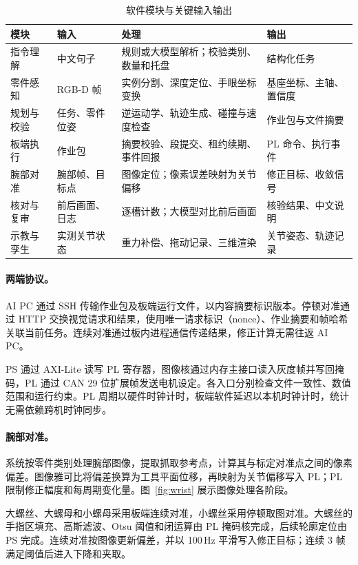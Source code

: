 \begin{table}[H]
\centering\small
\renewcommand{\arraystretch}{1.08}
\caption{软件模块与关键输入输出}\label{tab:sw}
\begin{tabularx}{\linewidth}{@{}p{2.3cm} Y Y Y@{}}
\toprule
模块 & 输入 & 处理 & 输出 \\
\midrule
指令理解 & 中文句子 & 规则或大模型解析；校验类别、数量和托盘 & 结构化任务  \\
零件感知 & RGB-D 帧 & 实例分割、深度定位、手眼坐标变换 & 基座坐标、主轴、置信度 \\
规划与校验 & 任务、零件位姿 & 逆运动学、轨迹生成、碰撞与速度检查 & 作业包与文件摘要 \\
板端执行 & 作业包 & 摘要校验、段提交、租约续期、事件回报 & PL 命令、执行事件 \\
腕部对准 & 腕部帧、目标点 & 图像定位；像素误差映射为关节偏移 & 修正目标、收敛信号 \\
核对与复审 & 前后画面、日志 & 逐槽计数；大模型对比前后画面 & 核验结果、中文说明 \\
示教与孪生 & 实测关节状态 & 重力补偿、拖动记录、三维渲染 & 关节姿态、轨迹记录 \\
\bottomrule
\end{tabularx}
\end{table}

\paragraph{两端协议。}AI PC 通过 SSH 传输作业包及板端运行文件，以内容摘要标识版本。停顿对准通过 HTTP 交换视觉请求和结果，使用唯一请求标识（nonce）、作业摘要和帧哈希关联当前任务。连续对准通过板内进程通信传递结果，修正计算无需往返 AI PC。

PS 通过 AXI-Lite 读写 PL 寄存器，图像核通过内存主接口读入灰度帧并写回掩码，PL 通过 CAN 29 位扩展帧发送电机设定。各入口分别检查文件一致性、数值范围和运行约束。PL 周期以硬件时钟计时，板端软件延迟以本机时钟计时，统计无需依赖跨机时钟同步。

\paragraph{腕部对准。}系统按零件类别处理腕部图像，提取抓取参考点，计算其与标定对准点之间的像素偏差。图像雅可比将偏差换算为工具平面位移，再映射为关节偏移写入 PL；PL 限制修正幅度和每周期变化量。图~\ref{fig:wrist} 展示图像处理各阶段。

大螺丝、大螺母和小螺母采用板端连续对准，小螺丝采用停顿取图对准。大螺丝的手指区填充、高斯滤波、Otsu 阈值和闭运算由 PL 掩码核完成，后续轮廓定位由 PS 完成。连续对准按图像更新偏差，并以 100\,Hz 平滑写入修正目标；连续 3 帧满足阈值后进入下降和夹取。

